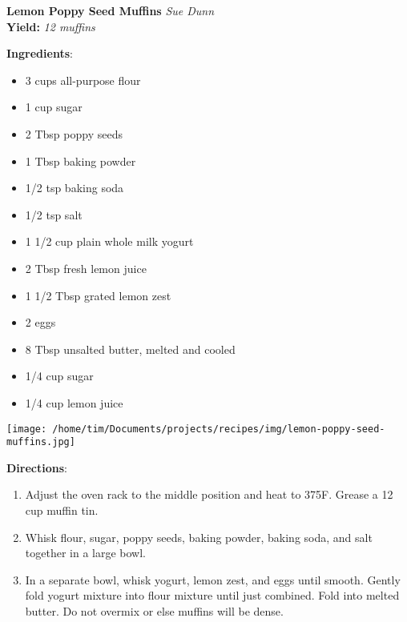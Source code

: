 \documentclass[11pt, twoside, openany]{book}
\begin{document}
\noindent\begin{minipage}[t]{\linewidth}%
{\Large\textbf{Lemon Poppy Seed Muffins}} \label{lemon-poppy-seed-muffins}\hfill\textit{Sue Dunn}\\
\textbf{Yield:} \textit{12 muffins}\\
\noindent\begin{minipage}[t]{0.78\linewidth}%
\textbf{Ingredients}:\vspace{-3mm}
\begin{multicols}{2}
\begin{itemize}\setlength\itemsep{-1mm}
\item 3 cups all-purpose flour
\item 1 cup sugar
\item 2 Tbsp poppy seeds
\item 1 Tbsp baking powder
\item 1/2 tsp baking soda
\item 1/2 tsp salt
\item 1 1/2 cup plain whole milk yogurt
\item 2 Tbsp fresh lemon juice
\item 1 1/2 Tbsp grated lemon zest
\item 2 eggs
\item 8 Tbsp unsalted butter, melted and cooled
\item 1/4 cup sugar
\item 1/4 cup lemon juice
\end{itemize}
\end{multicols}
\end{minipage}
\noindent\begin{minipage}[t]{0.18\linewidth}
\centering \strut\vspace*{-\baselineskip}\newline
\texttt{[image: /home/tim/Documents/projects/recipes/img/lemon-poppy-seed-muffins.jpg]}\\
\end{minipage}\vspace{3mm}
\textbf{Directions}:
\vspace{-3mm}\begin{enumerate}\setlength\itemsep{-1mm}
\item Adjust the oven rack to the middle position and heat to 375F. Grease a 12 cup muffin tin.
\item Whisk flour, sugar, poppy seeds, baking powder, baking soda, and salt together in a large bowl.
\item In a separate bowl, whisk yogurt, lemon zest, and eggs until smooth. Gently fold yogurt mixture into flour mixture until just combined. Fold into melted butter. Do not overmix or else muffins will be dense.

\end{enumerate}
\end{minipage}
\end{document}
